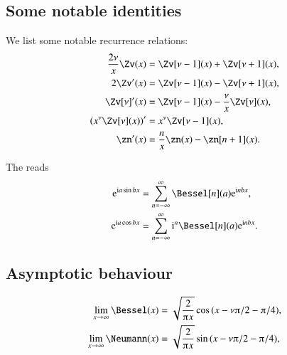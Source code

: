 \subsection{Some notable identities}
    We list some notable recurrence relations:
    \begin{subequations}
        \begin{align}
           \frac{2\nu}{x}\Zv(x) &= \Zv[\nu-1](x) + \Zv[\nu+1](x), \label{eq:derivations:cylinder:recurr_Z_plus}\\
            2\Zv'(x) &= \Zv[\nu-1](x) - \Zv[\nu+1](x),\label{eq:derivations:cylinder:recurr_Z_minus} \\
            \Zv[\nu]'(x) &= \Zv[\nu-1](x) - \frac{\nu}{x}\Zv[\nu](x),\label{eq:derivations:cylinder:recurr_Z_minus_vol2} \\
            \pclosed{x^\nu \Zv[\nu](x)}' &= x^\nu \Zv[\nu-1] (x),\label{eq:derivations:cylinder:der_idk_Z_123} \\
            \zn'(x) &= \frac{n}{x}\zn(x) -\zn[n+1](x).
        \end{align}
    \end{subequations}


    The  reads
    \begin{subequations}\label{eq:cylinder:Jacobi_Anger}
        \begin{align}
            \eu[\im a \sin{bx}]  &= \sum_{n=-\infty}^{\infty} \Bessel[n](a) \eu[\im n bx],\label{eq:cylinder:Jacobi_Anger_sin} \\
            \eu[\im a \cos{bx}]  &= \sum_{n=-\infty}^{\infty} \im^{n}\Bessel[n](a) \eu[\im n bx] \label{eq:cylinder:Jacobi_Anger_cos}.
        \end{align}
    \end{subequations}
    


\subsection{Asymptotic behaviour}

    \begin{subequations}\label{eq:cylinder:prop:JacobiAnger}
        \begin{align}
            \lim_{x\to \infty} \Bessel(x) &=
            \sqrt{\frac{2}{\ppi x}} \cos{(x - \nu \ppi/2 - \ppi/4)}, \label{eq:cylinder:prop:JacobiAnger_sin}  \\
            \lim_{x\to \infty} \Neumann(x) &=
            \sqrt{\frac{2}{\ppi x}} \sin{(x - \nu \ppi/2 - \ppi/4)},\label{eq:cylinder:prop:JacobiAnger_cos} 
        \end{align}
    \end{subequations}


